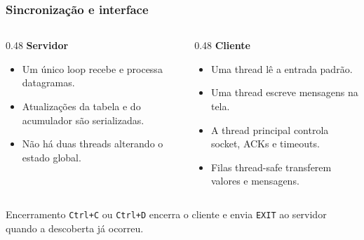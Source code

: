 \documentclass{beamer}
\begin{document}
\begin{frame}
  \frametitle{Sincronização e interface}
  \begin{columns}[T]
    \begin{column}{0.48\textwidth}
      \textbf{Servidor}
      \begin{itemize}
        \item Um único loop recebe e processa datagramas.
        \item Atualizações da tabela e do acumulador são serializadas.
        \item Não há duas threads alterando o estado global.
      \end{itemize}
    \end{column}
    \begin{column}{0.48\textwidth}
      \textbf{Cliente}
      \begin{itemize}
        \item Uma thread lê a entrada padrão.
        \item Uma thread escreve mensagens na tela.
        \item A thread principal controla socket, ACKs e timeouts.
        \item Filas thread-safe transferem valores e mensagens.
      \end{itemize}
    \end{column}
  \end{columns}

  \vspace{1em}
  \begin{block}{Encerramento}
    \texttt{Ctrl+C} ou \texttt{Ctrl+D} encerra o cliente e envia \texttt{EXIT} ao servidor quando a descoberta já ocorreu.
  \end{block}
\end{frame}
\end{document}
